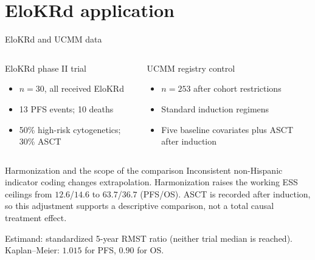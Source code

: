 \documentclass[11pt,aspectratio=169]{beamer}
\begin{document}
\section{EloKRd application}
\begin{frame}{EloKRd and UCMM data}
  \begin{columns}[T,onlytextwidth]
      \begin{block}{EloKRd phase II trial}
        \begin{itemize}
          \item $n=30$, all received EloKRd
          \item 13 PFS events; 10 deaths
          \item 50\% high-risk cytogenetics; 30\% ASCT
        \end{itemize}
      \end{block}
      \begin{block}{UCMM registry control}
        \begin{itemize}
          \item $n=253$ after cohort restrictions
          \item Standard induction regimens
          \item Five baseline covariates plus ASCT after induction
        \end{itemize}
      \end{block}
  \end{columns}
  \vspace{0.3em}
  \begin{alertblock}{Harmonization and the scope of the comparison}
    Inconsistent non-Hispanic indicator coding changes extrapolation. Harmonization raises the working ESS ceilings from $12.6$/$14.6$ to $63.7$/$36.7$ (PFS/OS). ASCT is recorded after induction, so this adjustment supports a descriptive comparison, not a total causal treatment effect.
  \end{alertblock}
  \centering\footnotesize Estimand: standardized 5-year RMST ratio (neither trial median is reached). Kaplan--Meier: $1.015$ for PFS, $0.90$ for OS.
\end{frame}
\end{document}
